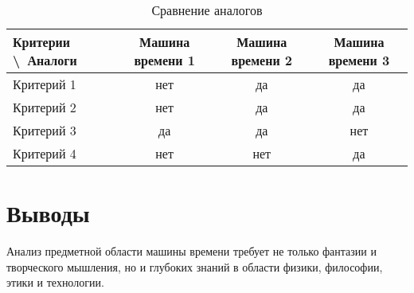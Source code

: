 \begin{table}[h]
	\Large
	\caption{Сравнение аналогов}
	\label{t:comp-an}
	\centering
	\begin{tabularx}{\textwidth}{|X|c|c|c|}
		\hline
		Критерии \textbackslash\ Аналоги & Машина времени 1 & Машина времени 2 & Машина времени 3 \\
		\hline
		Критерий 1
		                                 & нет              & да               & да               \\
		\hline
		Критерий 2
		                                 & нет              & да               & да               \\
		\hline
		Критерий 3
		                                 & да               & да               & нет              \\
		\hline
		Критерий 4
		                                 & нет              & нет              & да               \\
		\hline
	\end{tabularx}
\end{table}

\pagebreak

\section*{Выводы}


Анализ предметной области машины времени требует не только фантазии и творческого мышления, но и глубоких знаний в области физики, философии, этики и технологии.


